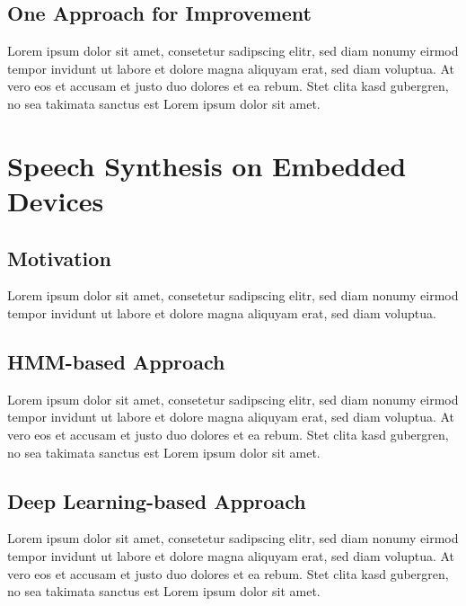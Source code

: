 \subsection{One Approach for Improvement}

Lorem ipsum dolor sit amet, consetetur sadipscing elitr, sed diam nonumy eirmod tempor invidunt ut labore et dolore magna aliquyam erat, sed diam voluptua. At vero eos et accusam et justo duo dolores et ea rebum. Stet clita kasd gubergren, no sea takimata sanctus est Lorem ipsum dolor sit amet.

\section{Speech Synthesis on Embedded Devices}
\label{sec:embeddedspeech1}

\subsection{Motivation}

Lorem ipsum dolor sit amet, consetetur sadipscing elitr, sed diam nonumy eirmod tempor invidunt ut labore et dolore magna aliquyam erat, sed diam voluptua.

\subsection{\ac{HMM}-based Approach}

Lorem ipsum dolor sit amet, consetetur sadipscing elitr, sed diam nonumy eirmod tempor invidunt ut labore et dolore magna aliquyam erat, sed diam voluptua. At vero eos et accusam et justo duo dolores et ea rebum. Stet clita kasd gubergren, no sea takimata sanctus est Lorem ipsum dolor sit amet.

\subsection{Deep Learning-based Approach}

Lorem ipsum dolor sit amet, consetetur sadipscing elitr, sed diam nonumy eirmod tempor invidunt ut labore et dolore magna aliquyam erat, sed diam voluptua. At vero eos et accusam et justo duo dolores et ea rebum. Stet clita kasd gubergren, no sea takimata sanctus est Lorem ipsum dolor sit amet.

\newpage